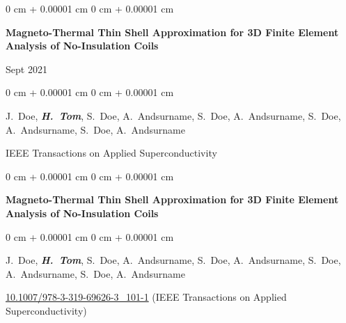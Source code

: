 \documentclass[10pt, letterpaper]{article}
\newenvironment{onecolentry}{
    \begin{adjustwidth}{
        0 cm + 0.00001 cm
    }{
        0 cm + 0.00001 cm
    }
}{
    \end{adjustwidth}
} %
\newenvironment{twocolentry}[2][]{
    \onecolentry
    \def\secondColumn{#2}
    \setcolumnwidth{\fill, 4.5 cm}
    \begin{paracol}{2}
}{
    \switchcolumn \raggedleft \secondColumn
    \end{paracol}
    \endonecolentry
} %
\begin{document}
        \vspace{0.2 cm}

        \begin{samepage}
            \begin{twocolentry}{
                Sept 2021
            }
                \textbf{Magneto-Thermal Thin Shell Approximation for 3D Finite Element Analysis of No-Insulation Coils}
            \end{twocolentry}

            \vspace{0.10 cm}
            
            \begin{onecolentry}
                \mbox{J. Doe}, \mbox{\textbf{\textit{H. Tom}}}, \mbox{S. Doe}, \mbox{A. Andsurname}, \mbox{S. Doe}, \mbox{A. Andsurname}, \mbox{S. Doe}, \mbox{A. Andsurname}, \mbox{S. Doe}, \mbox{A. Andsurname}

                \vspace{0.10 cm}
                
        IEEE Transactions on Applied Superconductivity\end{onecolentry}
        \end{samepage}

        \vspace{0.2 cm}

        \begin{samepage}
            \begin{onecolentry}
                \textbf{Magneto-Thermal Thin Shell Approximation for 3D Finite Element Analysis of No-Insulation Coils}
            \end{onecolentry}

            \vspace{0.10 cm}
            
            \begin{onecolentry}
                \mbox{J. Doe}, \mbox{\textbf{\textit{H. Tom}}}, \mbox{S. Doe}, \mbox{A. Andsurname}, \mbox{S. Doe}, \mbox{A. Andsurname}, \mbox{S. Doe}, \mbox{A. Andsurname}, \mbox{S. Doe}, \mbox{A. Andsurname}

                \vspace{0.10 cm}
                
        \href{https://doi.org/10.1007/978-3-319-69626-3_101-1}{10.1007/978-3-319-69626-3\_101-1}
         (IEEE Transactions on Applied Superconductivity)\end{onecolentry}
        \end{samepage}
\end{document}
